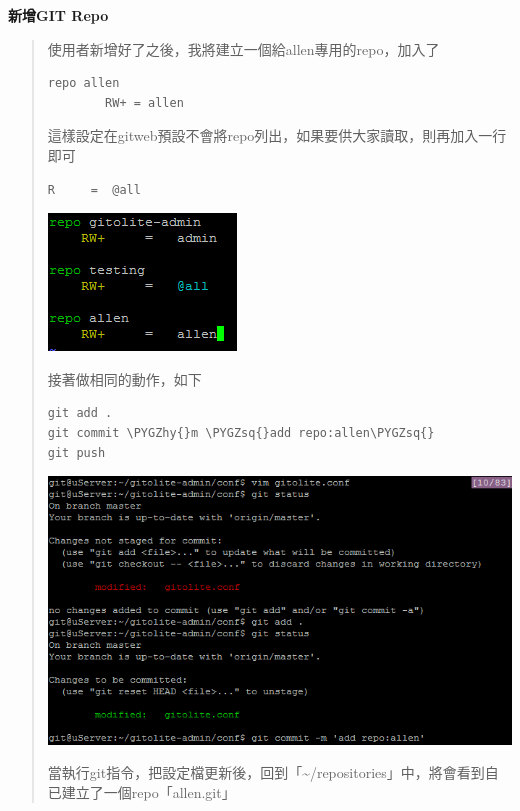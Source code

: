 \documentclass[letterpaper,10pt,english]{sphinxmanual}
\def\PYGZhy{\char`\-}
\def\PYGZsq{\char`\'}
\begin{document}
\textbf{新增GIT Repo}
\begin{quote}

使用者新增好了之後，我將建立一個給allen專用的repo，加入了

\begin{Verbatim}[commandchars=\\\{\}]
repo allen
        RW+ = allen
\end{Verbatim}

這樣設定在gitweb預設不會將repo列出，如果要供大家讀取，則再加入一行即可

\begin{Verbatim}[commandchars=\\\{\}]
R     =  @all
\end{Verbatim}

\includegraphics{gitolite3-addrepo-1.png}

接著做相同的動作，如下

\begin{Verbatim}[commandchars=\\\{\}]
git add .
git commit \PYGZhy{}m \PYGZsq{}add repo:allen\PYGZsq{}
git push
\end{Verbatim}

\includegraphics{gitolite3-addrepo-2.png}

當執行git指令，把設定檔更新後，回到「\textasciitilde{}/repositories」中，將會看到自已建立了一個repo「allen.git」


\end{quote}
\end{document}

